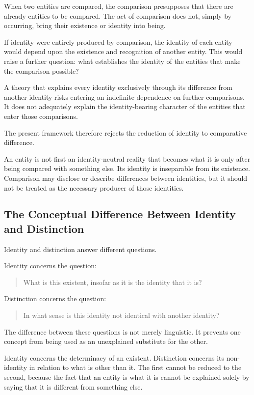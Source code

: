 When two entities are compared, the comparison presupposes that
there are already entities to be compared. The act of comparison
does not, simply by occurring, bring their existence or identity
into being.

If identity were entirely produced by comparison, the identity
of each entity would depend upon the existence and recognition
of another entity. This would raise a further question: what
establishes the identity of the entities that make the comparison
possible?

A theory that explains every identity exclusively through its
difference from another identity risks entering an indefinite
dependence on further comparisons. It does not adequately explain
the identity-bearing character of the entities that enter those
comparisons.

The present framework therefore rejects the reduction of identity
to comparative difference.

An entity is not first an identity-neutral reality that becomes
what it is only after being compared with something else. Its
identity is inseparable from its existence. Comparison may disclose
or describe differences between identities, but it should not
be treated as the necessary producer of those identities.

\subsection{The Conceptual Difference Between Identity and Distinction}

Identity and distinction answer different questions.

Identity concerns the question:

\begin{quote}
What is this existent, insofar as it is the identity that it is?
\end{quote}

Distinction concerns the question:

\begin{quote}
In what sense is this identity not identical with another identity?
\end{quote}

The difference between these questions is not merely linguistic.
It prevents one concept from being used as an unexplained substitute
for the other.

Identity concerns the determinacy of an existent. Distinction
concerns its non-identity in relation to what is other than it.
The first cannot be reduced to the second, because the fact that
an entity is what it is cannot be explained solely by saying that
it is different from something else.

